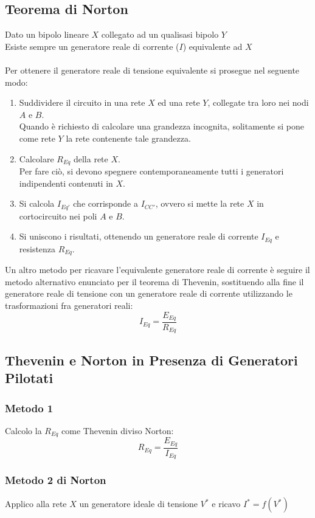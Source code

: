 \documentclass[../main.tex]{subfiles}
\begin{document}
	\subsection{Teorema di Norton}
	Dato un bipolo lineare $X$ collegato ad un qualisasi bipolo $Y$\\
	Esiste sempre un generatore reale di corrente ($I$) equivalente ad $X$\\\\
	Per ottenere il generatore reale di tensione equivalente si prosegue nel seguente modo:
	\begin{enumerate}
		\item Suddividere il circuito in una rete $X$ ed una rete $Y$, collegate tra loro nei nodi $A$ e $B$.\\
		Quando è richiesto di calcolare una grandezza incognita, solitamente si pone come rete $Y$ la rete contenente tale grandezza.
		\item Calcolare $R_{Eq}$ della rete $X$.\\
		Per fare ciò, si devono spegnere contemporaneamente tutti i generatori indipendenti contenuti in $X$.
		\item Si calcola $I_{Eq'}$ che corrisponde a $I_{CC'}$, ovvero si mette la rete $X$ in cortocircuito nei poli $A$ e $B$.
		\item Si uniscono i risultati, ottenendo un generatore reale di corrente $I_{Eq}$ e resistenza $R_{Eq}$.
	\end{enumerate}
	Un altro metodo per ricavare l’equivalente generatore reale di corrente è seguire il metodo alternativo enunciato
	per il teorema di Thevenin, sostituendo alla fine il generatore reale di tensione con un generatore reale di
	corrente utilizzando le trasformazioni fra generatori reali:
	\[I_{Eq} = \frac{E_{Eq}}{R_{Eq}}\]
	\subsection{Thevenin e Norton in Presenza di Generatori Pilotati}
	\subsubsection{Metodo 1}
	Calcolo la $R_{Eq}$ come Thevenin diviso Norton:
	\[R_{Eq} = \frac{E_{Eq}}{I_{Eq}}\]
	\subsubsection{Metodo 2 di Norton}
	Applico alla rete $X$ un generatore ideale di tensione $V^*$ e ricavo $I^* = f(V^*)$
\end{document}
